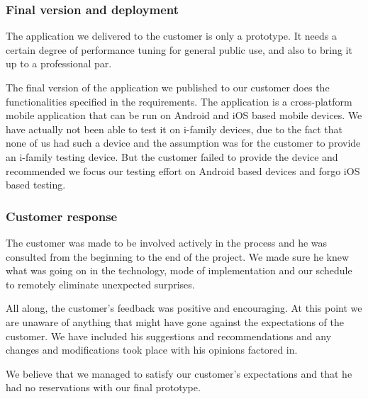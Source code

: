     
	\subsubsection{Final version and deployment}
The application we delivered to the customer is only a prototype. It needs a certain degree of performance tuning for general public use, and also to bring it up to a professional par.

The final version of the application we published to our customer does the functionalities specified in the requirements. The application is a cross-platform mobile application that can be run on Android and iOS based mobile devices. We have actually not been able to test it on i-family devices, due to the fact that none of us had such a device and the assumption was for the customer to provide an i-family testing device. But the customer failed to provide the device and recommended we focus our testing effort on Android based devices and forgo iOS based testing.



	\subsubsection{Customer response}
The customer was made to be involved actively in the process and he was consulted from the beginning to the end of the project. We made sure he knew what was going on in the technology, mode of implementation and our schedule to remotely eliminate unexpected surprises.

All along, the customer's feedback was positive and encouraging. At this point we are unaware of anything that might have gone against the expectations of the customer.
We have included his suggestions and recommendations and any changes and modifications took place with his opinions factored in.

We believe that we managed to satisfy our customer's expectations and that he had no reservations with our final prototype.
	


